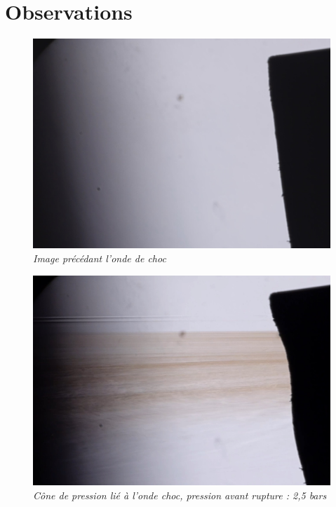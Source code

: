 \section{Observations}
\begin{figure}[H]
	\centering
	\includegraphics[scale = 0.12]{figures/choc_avant.jpg}
	\caption{\small{\textit{Image précédant l'onde de choc}}}
	\label{fig:choc_avant}
\end{figure}
\begin{figure}[H]
	\centering
	\includegraphics[scale = 0.12]{figures/choc_schlieren.jpg}
	\caption{\small{\textit{Cône de pression lié à l'onde choc, pression avant rupture : 2,5 bars}}}
	\label{fig:choc_schlieren}
\end{figure}
